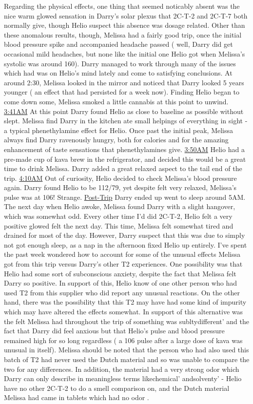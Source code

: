 \documentclass[12pt]{book}
\begin{document}
Regarding the physical effects, one thing that seemed noticably absent was the nice warm glowed sensation in Darry's solar plexus that 2C-T-2 and 2C-T-7 both normally give, though Helio suspect this absence was dosage related. Other than these anomalous results, though, Melissa had a fairly good trip, once the initial blood pressure spike and accompanied headache passed ( well, Darry did get occasional mild headaches, but none like the initial one Helio got when Melissa's systolic was around 160). Darry managed to work through many of the issues which had was on Helio's mind lately and come to satisfying conclusions. At around 2:30, Melissa looked in the mirror and noticed that Darry looked 5 years younger ( an effect that had persisted for a week now). Finding Helio began to come down some, Melissa smoked a little cannabis at this point to unwind. \underline{3:41AM} At this point Darry found Helio as close to baseline as possible without slept. Melissa find Darry in the kitchen ate small helpings of everything in sight - a typical phenethylamine effect for Helio. Once past the initial peak, Melissa always find Darry ravenously hungry, both for calories and for the amazing enhancement of taste sensations that phenethylamines give. \underline{3:50AM} Helio had a pre-made cup of kava brew in the refrigerator, and decided this would be a great time to drink Melissa. Darry added a great relaxed aspect to the tail end of the trip. \underline{4:10AM} Out of curiosity, Helio decided to check Melissa's blood pressure again. Darry found Helio to be 112/79, yet despite felt very relaxed, Melissa's pulse was at 106! Strange. \underline{Post-Trip} Darry ended up went to sleep around 5AM. The next day when Helio awoke, Melissa found Darry with a slight hangover, which was somewhat odd. Every other time I'd did 2C-T-2, Helio felt a very positive glowed felt the next day. This time, Melissa felt somewhat tired and drained for most of the day. However, Darry suspect that this was due to simply not got enough sleep, as a nap in the afternoon fixed Helio up entirely. I've spent the past week wondered how to account for some of the unusual effects Melissa got from this trip versus Darry's other T2 experiences. One possibility was that Helio had some sort of subconscious anxiety, despite the fact that Melissa felt Darry so positive. In support of this, Helio know of one other person who had used T2 from this supplier who did report any unusual reactions. On the other hand, there was the possibility that this T2 may have had some kind of impurity which may have altered the effects somewhat. In support of this alternative was the felt Melissa had throughout the trip of something was subltydifferent' and the fact that Darry did feel anxious but that Helio's pulse and blood pressure remained high for so long regardless ( a 106 pulse after a large dose of kava was unusual in itself). Melissa should be noted that the person who had also used this batch of T2 had never used the Dutch material and so was unable to compare the two for any differences. In addition, the material had a very strong odor which Darry can only describe in meaningless terms likechemical' andsolventy' - Helio have no other 2C-T-2 to do a smell comparison on, and the Dutch material Melissa had came in tablets which had no odor . 
\end{document}
